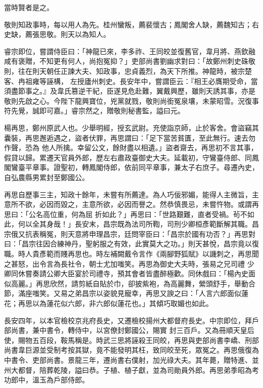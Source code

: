 \begin{pinyinscope}
 當時賢者是之。



 敬則知政事時，每以用人為先。桂州蠻叛，薦裴懷古；鳳閣舍人缺，薦魏知古；右史缺，薦張思敬。則天以為知人。



 睿宗即位，嘗謂侍臣曰：「神龍已來，李多祚、王同皎並復舊官，韋月將、燕欽融咸有褒贈，不知更有何人，尚抱冤抑？」吏部尚書劉幽求對曰：「故鄭州刺史硃敬則，往在則天朝任正諫大夫、知政事，忠貞義烈，為天下所推。神龍時，被宗楚客、冉祖雍等誣構，
 左授廬州刺史。長安年中，嘗謂臣云：『相王必膺期受命，當須盡節事之。』及韋氏篡逆干紀，臣遂見危赴難，翼戴興歷，雖則天誘其事，亦是敬則先啟之心。今陛下龍興寶位，兇黨就戮，敬則尚銜冤泉壤，未蒙昭雪。況復事符先覺，誠即可嘉。」睿宗然之，贈敬則秘書監，謚曰元。



 楊再思，鄭州原武人也。少舉明經，授玄武尉。充使詣京師，止於客舍。會盜竊其囊裝，再思邂逅遇之，盜者伏罪，再思謂曰：「足下當苦貧匱，至此無行。速去勿作聲，恐為
 他人所擒。幸留公文，餘財盡以相遺。」盜者齋去，再思初不言其事，假貸以歸。累遷天官員外郎，歷左右肅政臺御史大夫。延載初，守鸞臺侍郎、同鳳閣鸞臺平章事。證聖初，轉鳳閣侍郎，依前同平章事，兼太子右庶子。尋遷內史，自弘農縣男累封至鄭國公。



 再思自歷事三主，知政十餘年，未嘗有所薦達。為人巧佞邪媚，能得人主微旨，主意所不欲，必因而毀之，主意所欲，必因而譽之。然恭慎畏忌，未嘗忤物。或謂再思曰：「公名高位重，何為屈
 折如此？」再思曰：「世路艱難，直者受禍。茍不如此，何以全其身哉！」長安末，昌宗既為法司所鞫，司刑少卿桓彥範斷解其職。昌宗俄又抗表稱冤，則天意將申理昌宗，廷問宰臣曰：「昌宗於國有功否？」再思對曰：「昌宗往因合練神丹，聖躬服之有效，此實莫大之功。」則天甚悅，昌宗竟以復職。時人貴彥範而賤再思也。時左補闕戴令言作《兩腳野狐賦》以譏刺之，再思聞之甚怒，出令言為長社令，朝士尤加嗤笑。再思為御史大夫時，張易之兄司禮
 少卿同休嘗奏請公卿大臣宴於司禮寺，預其會者皆盡醉極歡。同休戲曰：「楊內史面似高麗。」再思欣然，請剪紙自貼於巾，卻披紫袍，為高麗舞，縈頭舒手，舉動合節，滿座嗤笑。又易之弟昌宗以姿貌見寵幸，再思又諛之曰：「人言六郎面似蓮花；再思以為蓮花似六郎，非六郎似蓮花也。」其傾巧取媚也如此。



 長安四年，以本官檢校京兆府長史，又遷檢校揚州大都督府長史。中宗即位，拜戶部尚書，兼中書令，轉侍中，以宮僚封鄭國公，賜實
 封三百戶。又為冊順天皇后使，賜物五百段，鞍馬稱是。時武三思將誣殺王同皎，再思與吏部尚書李嶠、刑部尚書韋巨源並受制考按其獄，竟不能發明其枉，致同皎至死，眾冤之。再思俄復為中書令、吏部尚書。景龍三年，遷尚書右僕射，加光祿大夫。其年薨，贈特進、並州大都督，陪葬乾陵，謚曰恭。子植、植子獻，並為司勛員外郎。再思弟季昭為考功郎中，溫玉為戶部侍郎。




\end{pinyinscope}
